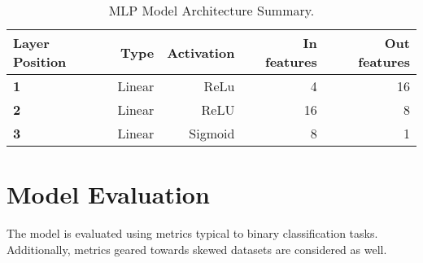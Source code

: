 \begin{table}[htb]
  \centering
  \caption{MLP Model Architecture Summary.}
  \begin{tabular}{lrrrr}
    \hline
    Layer Position & Type & Activation & In features & Out features \\
    \hline
    \textbf{1} & Linear & ReLu & 4 & 16 \\
    \textbf{2} & Linear & ReLU & 16 & 8 \\
    \textbf{3} & Linear & Sigmoid & 8 & 1 \\
    \hline
  \end{tabular}
  \label{tab:mlp-model-arch}
\end{table}

\section{Model Evaluation}
\label{sec:mlp-model-eval}

The model is evaluated using metrics typical to binary classification
tasks. Additionally, metrics geared towards skewed datasets are
considered as well.

